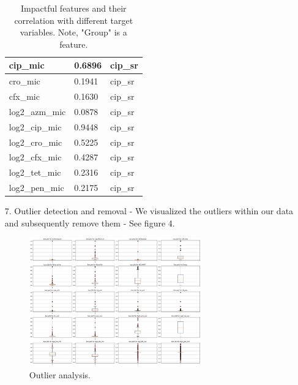 \documentclass[manuscript,screen,review, nonacm]{acmart}
\begin{document}
\begin{itemize}
\begin{table}[H]
\begin{tabular}{|l|l|l|}
                cip\_mic                   & 0.6896               & cip\_sr         \\ \hline
                cro\_mic                   & 0.1941               & cip\_sr         \\ \hline
                cfx\_mic                   & 0.1630               & cip\_sr         \\ \hline
                log2\_azm\_mic             & 0.0878               & cip\_sr         \\ \hline
                log2\_cip\_mic             & 0.9448               & cip\_sr         \\ \hline
                log2\_cro\_mic             & 0.5225               & cip\_sr         \\ \hline
                log2\_cfx\_mic             & 0.4287               & cip\_sr         \\ \hline
                log2\_tet\_mic             & 0.2316               & cip\_sr         \\ \hline
                log2\_pen\_mic             & 0.2175               & cip\_sr         \\ \hline
                \end{tabular}
                \caption{Impactful features and their correlation with different target variables. Note, "Group" is a feature.}
            \end{table}

    \item[7.] Outlier detection and removal - We visualized the outliers within our data and subsequently remove them - See figure 4.
            \begin{figure}[H]
                \centering
                \vspace{-10pt}
                \includegraphics[width=0.7\textwidth]{figures/outlier.png}
                \caption{Outlier analysis.}
                \vspace{-10pt}
            \end{figure}
        



\end{itemize}
\end{document}
